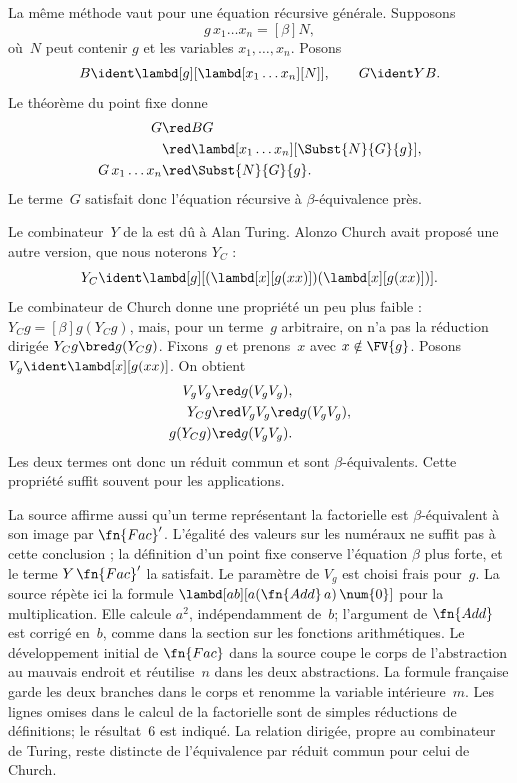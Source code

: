 \documentclass[../../../include/open-logic-section]{subfiles}
\begin{document}
La même méthode vaut pour une équation
récursive générale. Supposons
\[
  g\,x_1\dots x_n\equal[\beta]N,
\]
où~$N$ peut contenir $g$ et les
variables $x_1,\dots,x_n$. Posons
\[
  B\ident\lambd[g][
    \lambd[x_1\dots x_n][N]],
  \qquad G\ident YB.
\]
Le théorème du point fixe donne
\begin{align*}
  G &\red B G\\
    &\red \lambd[x_1\dots x_n]
      [\Subst{N}{G}{g}],\\
  G\,x_1\dots x_n
    &\red \Subst{N}{G}{g}.
\end{align*}
Le terme~$G$ satisfait donc l'équation
récursive à $\beta$-équivalence près.

Le combinateur~$Y$ de la
 est dû à
Alan Turing. Alonzo Church avait proposé
une autre version, que nous noterons
$Y_C$ :
\[
  Y_C\ident\lambd[g][
    (\lambd[x][g(xx)])
    (\lambd[x][g(xx)])].
\]
Le combinateur de Church donne une
propriété un peu plus faible :
$Y_Cg\equal[\beta]g(Y_Cg)$, mais,
pour un terme~$g$ arbitraire,
on n'a pas la réduction dirigée
$Y_Cg\bred g(Y_Cg)$.
Fixons~$g$ et prenons~$x$ avec $x\notin\FV{g}$. Posons
$V_g\ident\lambd[x][g(xx)]$.
On obtient
\begin{align*}
  V_gV_g &\red g(V_gV_g),\\
  Y_Cg &\red V_gV_g\red g(V_gV_g),\\
  g(Y_Cg) &\red g(V_gV_g).
\end{align*}
Les deux termes ont donc un réduit
commun et sont $\beta$-équivalents.
Cette propriété suffit souvent pour
les applications.

\begin{editorial}
La source affirme aussi qu’un terme représentant la factorielle est $\beta$-équivalent à son image par $\fn{Fac}'$. L’égalité des valeurs sur les numéraux ne suffit pas à cette conclusion ; la définition d’un point fixe conserve l’équation $\beta$ plus forte, et le terme $Y\,\fn{Fac}'$ la satisfait. Le paramètre de $V_g$ est choisi frais pour~$g$. La source répète ici la formule
$\lambd[ab][a(\fn{Add}\,a)\,\num{0}]$
pour la multiplication. Elle calcule
$a^2$, indépendamment de~$b$;
l'argument de $\fn{Add}$ est corrigé
en~$b$, comme dans la section sur les
fonctions arithmétiques. Le développement
initial de $\fn{Fac}$ dans la source
coupe le corps de l'abstraction au
mauvais endroit et réutilise~$n$
dans les deux abstractions. La formule
française garde les deux branches dans
le corps et renomme la variable
intérieure~$m$. Les lignes omises dans
le calcul de la factorielle sont de
simples réductions de définitions;
le résultat~$\num{6}$ est indiqué.
La relation dirigée, propre au
combinateur de Turing, reste distincte
de l'équivalence par réduit commun
pour celui de Church.
\end{editorial}
\end{document}
